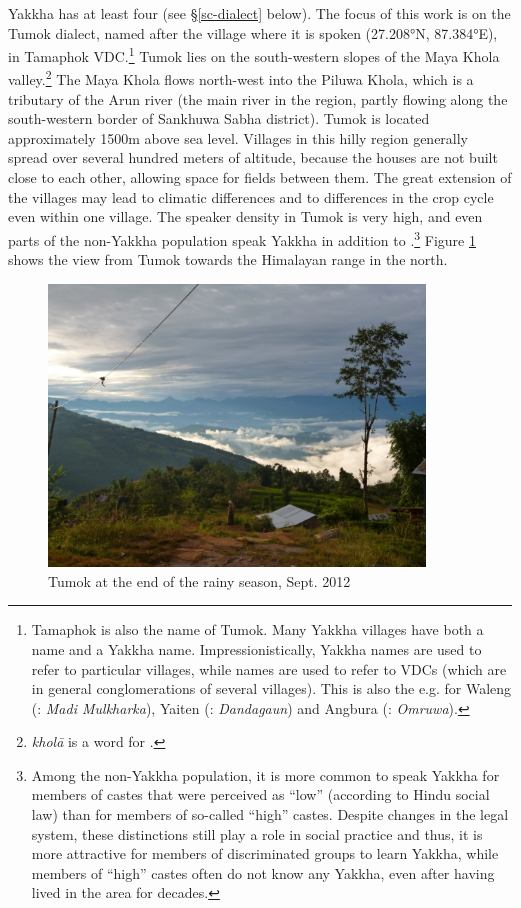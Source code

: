 Yakkha has at least four  (see §\ref{sc-dialect} below). The focus of this work is on the Tumok dialect, named after the village where it is spoken (27.208°N, 87.384°E), in Tamaphok VDC.\footnote{Tamaphok is also the  name of Tumok. Many Yakkha villages have both a  name and a Yakkha name. Impressionistically, Yakkha names are used to refer to particular villages, while   names are used to refer  to VDCs (which are in general conglomerations of several villages). This is also the  e.g. for Waleng (: \emph{Madi Mulkharka}), Yaiten (: \emph{Dandagaun}) and Angbura (: \emph{Omruwa}).} Tumok  lies on the south-western slopes of the Maya Khola valley.\footnote{\emph{kholā} is a  word for .} The Maya Khola flows north-west into the Piluwa Khola, which is a tributary of the Arun river (the main river in the region, partly flowing along the south-western border of Sankhuwa Sabha district). Tumok  is located approximately 1500m above sea level. Villages in this hilly region generally spread over several hundred meters of altitude, because the houses are not built close to each other, allowing space for fields between them. The great extension of the villages may lead to climatic differences and to differences in the crop cycle even within one village. The speaker density in Tumok is very high, and even parts of the non-Yakkha population speak Yakkha in addition to .\footnote{Among the non-Yakkha population, it is more common to speak Yakkha for members of castes that were perceived as “low” (according to Hindu social law)  than for members of so-called “high” castes. Despite changes in the legal system, these distinctions still play a role in social practice and thus, it is more attractive for members of discriminated groups to learn Yakkha, while members of “high” castes often do not know any Yakkha, even after having lived in the area for decades.} Figure \ref{tumok} shows the view from Tumok towards the Himalayan range in the north. 

\begin{figure}
\centering
\includegraphics[width=10cm]{figures/tamaphok.jpg}
\caption{Tumok at the end of the rainy season, Sept. 2012}\label{tumok}
\end{figure}
 

